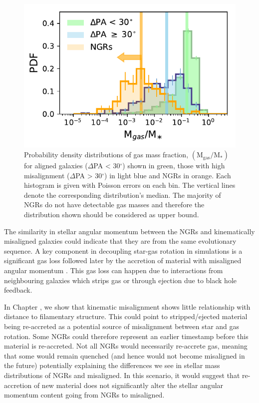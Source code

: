 \begin{figure}
    \centering
	\includegraphics[width=0.8\linewidth]{misalignment_MaNGA/gas_mass_normed_all.pdf}
    \caption{Probability density distributions of gas mass fraction, $\mathrm{(M_{gas}/M_{\ast})}$ for aligned galaxies ($\Delta$PA < 30$^{\circ}$) shown in green, those with high misalignment ($\Delta$PA > 30$^{\circ}$) in light blue and NGRs in orange. Each histogram is given with Poisson errors on each bin. The vertical lines denote the corresponding distribution's median. The majority of NGRs do not have detectable gas masses and therefore the distribution shown should be considered as upper bound.}
    \label{fig:delPA_gasM}
\end{figure}

The similarity in stellar angular momentum between the NGRs and kinematically misaligned galaxies could indicate that they are from the same evolutionary sequence. A key component in decoupling star-gas rotation in simulations is a significant gas loss followed later by the accretion of material with misaligned angular momentum \citep[][]{vdvoort2015, starkenburg+19}. This gas loss can happen due to interactions from neighbouring galaxies which strips gas or through ejection due to black hole feedback.

In Chapter , we show that kinematic misalignment shows little relationship with distance to filamentary structure. This could point to stripped/ejected material being re-accreted as a potential source of misalignment between star and gas rotation. Some NGRs could therefore represent an earlier timestamp before this material is re-accreted. Not all NGRs would necessarily re-accrete gas, meaning that some would remain quenched (and hence would not become misaligned in the future) potentially explaining the differences we see in stellar mass distributions of NGRs and misaligned. In this scenario, it would suggest that re-accretion of new material does not significantly alter the stellar angular momentum content going from NGRs to misaligned.

